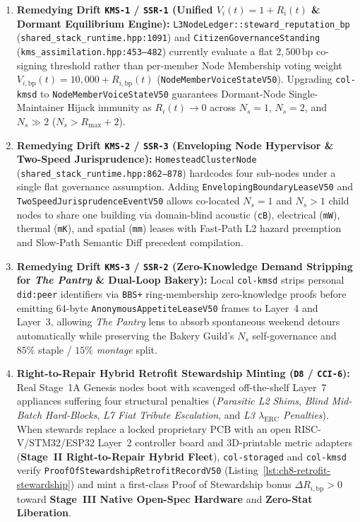 \begin{enumerate}
\item \textbf{Remedying Drift \texttt{KMS-1} / \texttt{SSR-1} (Unified $V_i(t) = 1 + R_i(t)$ \&
        Dormant Equilibrium Engine):} \texttt{L3NodeLedger::steward\_reputation\_bp}
        (\texttt{shared\_stack\_runtime.hpp:1091}) and \texttt{CitizenGovernanceStanding}
        (\texttt{kms\_assimilation.hpp:453--482}) currently evaluate a flat $2{,}500\,\mathrm{bp}$
        co-signing threshold rather than per-member Node Membership voting weight
        $V_{i,\mathrm{bp}}(t) = 10{,}000 + R_{i,\mathrm{bp}}(t)$ (\texttt{NodeMemberVoiceStateV50}).
        Upgrading \texttt{col-kmsd} to \texttt{NodeMemberVoiceStateV50} guarantees Dormant-Node
        Single-Maintainer Hijack immunity as $R_i(t) \to 0$ across $N_s = 1$, $N_s = 2$, and
        $N_s \gg 2$ ($N_s > R_{\max} + 2$).
\item \textbf{Remedying Drift \texttt{KMS-2} / \texttt{SSR-3} (Enveloping Node Hypervisor \&
        Two-Speed Jurisprudence):} \texttt{HomesteadClusterNode}
        (\texttt{shared\_stack\_runtime.hpp:862--878}) hardcodes four sub-nodes under a single
        flat governance assumption. Adding \texttt{EnvelopingBoundaryLeaseV50} and
        \texttt{TwoSpeedJurisprudenceEventV50} allows co-located $N_s = 1$ and $N_s > 1$ child
        nodes to share one building via domain-blind acoustic (\texttt{cB}), electrical
        (\texttt{mW}), thermal (\texttt{mK}), and spatial (\texttt{mm}) leases with Fast-Path L2
        hazard preemption and Slow-Path Semantic Diff precedent compilation.
\item \textbf{Remedying Drift \texttt{KMS-3} / \texttt{SSR-2} (Zero-Knowledge Demand Stripping for
        \textit{The Pantry} \& Dual-Loop Bakery):} Local \texttt{col-kmsd} strips personal
        \texttt{did:peer} identifiers via \texttt{BBS+} ring-membership zero-knowledge proofs
        before emitting 64-byte \texttt{AnonymousAppetiteLeaseV50} frames to Layer~4 and Layer~3,
        allowing \textit{The Pantry} lens to absorb spontaneous weekend detours automatically while
        preserving the Bakery Guild's $N_s$ self-governance and $85\%$ staple / $15\%$
        \textit{montage} split.
\item \textbf{Right-to-Repair Hybrid Retrofit Stewardship Minting (\texttt{D8} / \texttt{CCI-6}):}
        Real Stage~1A Genesis nodes boot with scavenged off-the-shelf Layer~7 appliances suffering
        four structural penalties (\textit{Parasitic L2 Shims}, \textit{Blind Mid-Batch
        Hard-Blocks}, \textit{L7 Fiat Tribute Escalation}, and \textit{L3 $\lambda_{\mathrm{ERC}}$
        Penalties}). When stewards replace a locked proprietary PCB with an open RISC-V/STM32/ESP32
        Layer~2 controller board and 3D-printable metric adapters (\textbf{Stage~II Right-to-Repair
        Hybrid Fleet}), \texttt{col-storaged} and \texttt{col-kmsd} verify
        \texttt{ProofOfStewardshipRetrofitRecordV50} (Listing~\ref{lst:ch8-retrofit-stewardship})
        and mint a first-class Proof of Stewardship bonus $\Delta R_{i,\mathrm{bp}} > 0$ toward
        \textbf{Stage~III Native Open-Spec Hardware} and \textbf{Zero-Stat Liberation}.
\end{enumerate}

